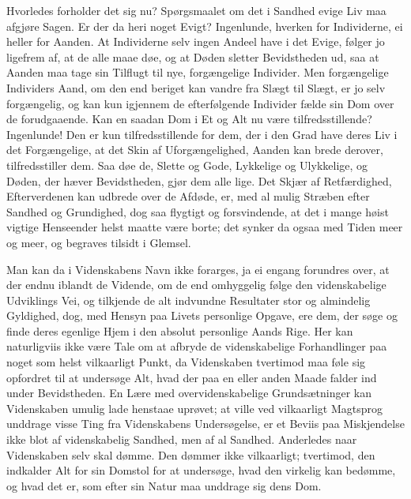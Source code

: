 \documentclass[12pt]{book}
\newcommand{\apage}[1]{\marginnote{\footnotesize\textit{[#1]}}}
\begin{document}
Hvorledes forholder det sig nu? Spørgsmaalet om det i Sandhed evige Liv maa
afgjøre Sagen. Er der da heri noget Evigt? Ingenlunde, hverken for Individerne,
ei heller for Aanden. At Individerne selv ingen Andeel have i det Evige, følger
jo ligefrem af, at de alle maae døe, og at Døden sletter Bevidstheden ud, saa
at Aanden maa tage sin Tilflugt til nye, forgængelige Individer. Men
forgængelige Individers Aand, om den end beriget kan vandre fra \apage{272} Slægt til
Slægt, er jo selv forgængelig, og kan kun igjennem de efterfølgende Individer
fælde sin Dom over de forudgaaende. Kan en saadan Dom i Et og Alt nu være
tilfredsstillende? Ingenlunde! Den er kun tilfredsstillende for dem, der i den
Grad have deres Liv i det Forgængelige, at det Skin af Uforgængelighed, Aanden
kan brede derover, tilfredsstiller dem. Saa døe de, Slette og Gode, Lykkelige
og Ulykkelige, og Døden, der hæver Bevidstheden, gjør dem alle lige. Det Skjær
af Retfærdighed, Efterverdenen kan udbrede over de Afdøde, er, med al mulig
Stræben efter Sandhed og Grundighed, dog saa flygtigt og forsvindende, at det
i mange høist vigtige Henseender helst maatte være borte; det synker da ogsaa
med Tiden meer og meer, og begraves tilsidt i Glemsel.

Man kan da i Videnskabens Navn ikke forarges, ja ei engang forundres over, at
der endnu iblandt de Vidende, om de end omhyggelig følge den videnskabelige
Udviklings Vei, og tilkjende de alt indvundne Resultater stor og almindelig
Gyldighed, dog, med Hensyn paa Livets personlige Opgave, ere dem, der søge og
finde deres egenlige Hjem i den absolut personlige Aands Rige. Her kan
naturligviis ikke være Tale om at afbryde de videnskabelige Forhandlinger paa
noget som helst vilkaarligt Punkt, da Videnskaben tvertimod maa føle sig
opfordret til at undersøge Alt, hvad der paa en eller anden Maade falder ind
under Bevidstheden. En Lære med overvidenskabelige Grundsætninger kan
Videnskaben umulig lade henstaae uprøvet; at ville ved vilkaarligt Magtsprog
unddrage visse Ting fra  \apage{273} Videnskabens Undersøgelse, er et Beviis paa
Miskjendelse ikke blot af videnskabelig Sandhed, men af al Sandhed. Anderledes
naar Videnskaben selv skal dømme. Den dømmer ikke vilkaarligt; tvertimod, den
indkalder Alt for sin Domstol for at undersøge, hvad den virkelig kan bedømme,
og hvad det er, som efter sin Natur maa unddrage sig dens Dom.
\end{document}
